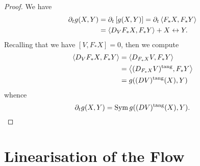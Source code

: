 \begin{proof}
We have
\[
\begin{split}
\partial_t g (X, Y) &= \partial_t \left[g(X, Y)\right] = \partial_t \left\langle F_{\ast} X,F_{\ast} Y \right\rangle \\
&= \left\langle D_V F_{\ast} X,F_{\ast} Y \right\rangle + X \leftrightarrow Y.
\end{split}
\]
Recalling that we have \([V, F_{\ast} X] = 0\), then we compute
\[
\begin{split}
\left\langle D_V F_{\ast} X,F_{\ast} Y \right\rangle &= \left\langle D_{F_{\ast} X} V,F_{\ast} Y \right\rangle \\
&= \left\langle (D_{F_{\ast} X} V)^{\operatorname{tang}},F_{\ast} Y \right\rangle \\
&= g((DV)^{\operatorname{tang}} (X), Y)
\end{split}
\]
whence
\[
\partial_t g (X, Y) = \operatorname{Sym} g((DV)^{\operatorname{tang}} (X), Y).
\]
\end{proof}

\section{Linearisation of the Flow}